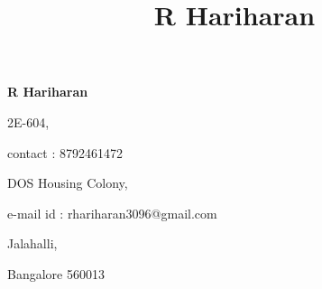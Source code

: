 \documentclass[a4paper,12pt,final]{article}
\title{R Hariharan}
\newcommand\textbox[1]{%
	\parbox{.500\textwidth}{#1}%
}
\begin{document}
	\begin{center}
		\bfseries \LARGE R Hariharan
	\end{center}
	\noindent\makebox[\linewidth]{\rule{\paperwidth}{0.4pt}}
	\noindent\textbox{\small 2E-604,\hfill}\textbox{\hfill \small contact : 8792461472}
	
	\noindent\textbox{\small DOS Housing Colony,\hfill}\textbox{\hfill \small e-mail id : rhariharan3096@gmail.com}
	
	\noindent\textbox{\small Jalahalli,}

	\noindent\textbox{\small Bangalore 560013}
\end{document}
